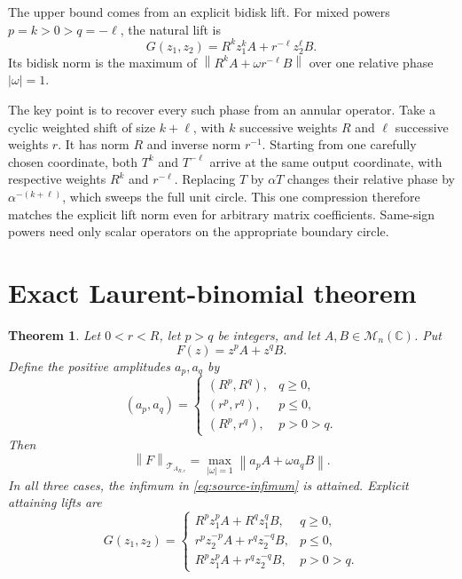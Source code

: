\documentclass[11pt]{article}
\newtheorem{theorem}{Theorem}
\newcommand{\C}{\mathbb C}
\newcommand{\M}{\mathcal M}
\newcommand{\T}{\mathcal T}
\newcommand{\norm}[1]{\left\lVert#1\right\rVert}
\begin{document}
The upper bound comes from an explicit bidisk lift.  For mixed powers
\(p=k>0>q=-\ell\), the natural lift is
\[
 G(z_1,z_2)=R^kz_1^kA+r^{-\ell}z_2^\ell B.
\]
Its bidisk norm is the maximum of
\(\norm{R^kA+\omega r^{-\ell}B}\) over one relative phase
\(|\omega|=1\).

The key point is to recover every such phase from an annular operator.  Take a
cyclic weighted shift of size \(k+\ell\), with \(k\) successive weights \(R\)
and \(\ell\) successive weights \(r\).  It has norm \(R\) and inverse norm
\(r^{-1}\).  Starting from one carefully chosen coordinate, both \(T^k\) and
\(T^{-\ell}\) arrive at the same output coordinate, with respective weights
\(R^k\) and \(r^{-\ell}\).  Replacing \(T\) by \(\alpha T\) changes their
relative phase by \(\alpha^{-(k+\ell)}\), which sweeps the full unit circle.
This one compression therefore matches the explicit lift norm even for
arbitrary matrix coefficients.  Same-sign powers need only scalar operators
on the appropriate boundary circle.

\section*{Exact Laurent-binomial theorem}

\begin{theorem}\label{thm:main}
Let \(0<r<R\), let \(p>q\) be integers, and let
\(A,B\in\M_n(\C)\).  Put
\[
 F(z)=z^pA+z^qB.
\]
Define the positive amplitudes \(a_p,a_q\) by
\[
 (a_p,a_q)=
 \begin{cases}
 (R^p,R^q),&q\ge0,\\
 (r^p,r^q),&p\le0,\\
 (R^p,r^q),&p>0>q.
 \end{cases}
\]
Then
\begin{equation}\label{eq:exact-norm}
 \boxed{
 \norm{F}_{\T_{A_{R,r}}}
 =\max_{|\omega|=1}\norm{a_pA+\omega a_qB}.}
\end{equation}
In all three cases, the infimum in \eqref{eq:source-infimum} is attained.
Explicit attaining lifts are
\begin{equation}\label{eq:lifts}
 G(z_1,z_2)=
 \begin{cases}
 R^pz_1^pA+R^qz_1^qB,&q\ge0,\\
 r^pz_2^{-p}A+r^qz_2^{-q}B,&p\le0,\\
 R^pz_1^pA+r^qz_2^{-q}B,&p>0>q.
 \end{cases}
\end{equation}
\end{theorem}
\end{document}
